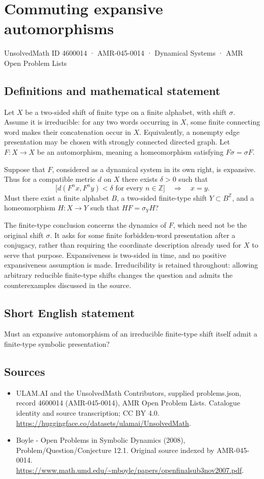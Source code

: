 \documentclass[11pt,a4paper]{article}
\begin{document}
\section*{Commuting expansive automorphisms}\label{4600014}
{\small UnsolvedMath ID 4600014 · AMR-045-0014 · Dynamical Systems · AMR Open Problem Lists}
\subsection{Definitions and mathematical statement}
Let $X$ be a two-sided shift of finite type on a finite alphabet, with shift
$\sigma$. Assume it is irreducible: for any two words occurring in $X$,
some finite connecting word makes their concatenation occur in $X$.
Equivalently, a nonempty edge presentation may be chosen with strongly
connected directed graph. Let $F:X\to X$ be an automorphism, meaning a
homeomorphism satisfying $F\sigma=\sigma F$.

Suppose that $F$, considered as a dynamical system in its own right, is
expansive. Thus for a compatible metric $d$ on $X$ there exists
$\delta>0$ such that
\[
 \bigl[d(F^n x,F^n y)<\delta\text{ for every }n\in\mathbb Z\bigr]
 \quad\Longrightarrow\quad x=y.
\]
Must there exist a finite alphabet $B$, a two-sided finite-type shift
$Y\subset B^{\mathbb Z}$, and a homeomorphism $H:X\to Y$ such that
$HF=\sigma_YH$?

The finite-type conclusion concerns the dynamics of $F$, which need not
be the original shift $\sigma$. It asks for some finite forbidden-word
presentation after a conjugacy, rather than requiring the coordinate
description already used for $X$ to serve that purpose. Expansiveness is
two-sided in time, and no positive expansiveness assumption is made.
Irreducibility is retained throughout: allowing arbitrary reducible
finite-type shifts changes the question and admits the counterexamples
discussed in the source.
\subsection{Short English statement}
Must an expansive automorphism of an irreducible finite-type shift itself admit a finite-type symbolic presentation?
\subsection{Sources}
\begin{itemize}
\item[S1] ULAM.AI and the UnsolvedMath Contributors, supplied problems.json, record 4600014 (AMR-045-0014), AMR Open Problem Lists. Catalogue identity and source transcription; CC BY 4.0.
\url{https://huggingface.co/datasets/ulamai/UnsolvedMath}.
\item[S2] Boyle - Open Problems in Symbolic Dynamics (2008), Problem/Question/Conjecture 12.1. Original source indexed by AMR-045-0014.
\url{https://www.math.umd.edu/~mboyle/papers/openfinalsub3nov2007.pdf}.
\end{itemize}
\end{document}
